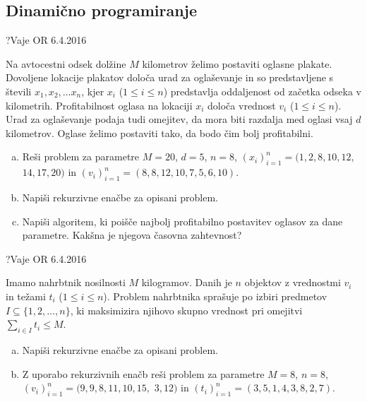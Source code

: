 \subsection{Dinamično programiranje}

\begin{naloga}{?}{Vaje OR 6.4.2016}
\begin{vprasanje}
Na avtocestni odsek dolžine $M$ kilometrov
želimo postaviti oglasne plakate.
Dovoljene lokacije plakatov določa urad za oglaševanje
in so predstavljene s števili $x_1, x_2, \dots x_n$,
kjer $x_i$ ($1 \le i \le n$)
predstavlja oddaljenost od začetka odseka v kilometrih.
Profitabilnost oglasa na lokaciji $x_i$ določa vrednost $v_i$
($1 \le i \le n$).
Urad za oglaševanje podaja tudi omejitev,
da mora biti razdalja med oglasi vsaj $d$ kilometrov.
Oglase želimo postaviti tako, da bodo čim bolj profitabilni.
\begin{enumerate}[(a)]
\item Reši problem za parametre $M = 20$, $d = 5$, $n = 8$,
$(x_i)_{i=1}^n = (1, 2, 8, 10, 12,$ $14, 17, 20)$ in
$(v_i)_{i=1}^n = (8, 8, 12, 10, 7, 5, 6, 10)$.
\item Napiši rekurzivne enačbe za opisani problem.
\item Napiši algoritem,
ki poišče najbolj profitabilno postavitev oglasov za dane parametre.
Kakšna je njegova časovna zahtevnost?
\end{enumerate}

\end{vprasanje}
\begin{odgovor}
\end{odgovor}
\end{naloga}


\begin{naloga}{?}{Vaje OR 6.4.2016}
\begin{vprasanje}
Imamo nahrbtnik nosilnosti $M$ kilogramov.
Danih je $n$ objektov z vrednostmi $v_i$ in težami $t_i$ ($1 \le i \le n$).
Problem nahrbtnika sprašuje po izbiri predmetov
$I \subseteq \{1, 2, \dots, n\}$,
ki maksimizira njihovo skupno vrednost pri omejitvi $\sum_{i \in I} t_i \le M$.
\begin{enumerate}[(a)]
\item Napiši rekurzivne enačbe za opisani problem.
\item Z uporabo rekurzivnih enačb reši problem za parametre $M = 8$, $n = 8$,
$(v_i)_{i=1}^n = (9, 9, 8, 11, 10, 15,$ $3, 12)$ in
$(t_i)_{i=1}^n = (3, 5, 1, 4, 3, 8, 2, 7)$.
\end{enumerate}

\end{vprasanje}
\begin{odgovor}
\end{odgovor}
\end{naloga}


